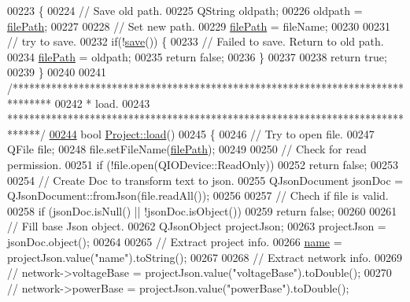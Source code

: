 \begin{DoxyCode}
00223 \{
00224   \textcolor{comment}{// Save old path.}
00225   QString oldpath;
00226   oldpath = \hyperlink{class_project_a79f30adcefd0b72bd4ac7db724bc9531}{filePath};
00227 
00228   \textcolor{comment}{// Set new path.}
00229   \hyperlink{class_project_a79f30adcefd0b72bd4ac7db724bc9531}{filePath} = fileName;
00230 
00231   \textcolor{comment}{// try to save.}
00232   \textcolor{keywordflow}{if}(!\hyperlink{class_project_a596a875bc5be73bc5b1b71b6448c1e07}{save}()) \{
00233     \textcolor{comment}{// Failed to save. Return to old path.}
00234     \hyperlink{class_project_a79f30adcefd0b72bd4ac7db724bc9531}{filePath} = oldpath;
00235     \textcolor{keywordflow}{return} \textcolor{keyword}{false};
00236   \}
00237 
00238   \textcolor{keywordflow}{return} \textcolor{keyword}{true};
00239 \}
00240 
00241 \textcolor{comment}{/*******************************************************************************}
00242 \textcolor{comment}{ * load.}
00243 \textcolor{comment}{ ******************************************************************************/}
\hypertarget{project_8cpp_source_l00244}{}\hyperlink{class_project_a1e373892a0383371132ce68fa5f8813d}{00244} \textcolor{keywordtype}{bool} \hyperlink{class_project_a1e373892a0383371132ce68fa5f8813d}{Project::load}()
00245 \{
00246   \textcolor{comment}{// Try to open file.}
00247   QFile file;
00248   file.setFileName(\hyperlink{class_project_a79f30adcefd0b72bd4ac7db724bc9531}{filePath});
00249 
00250   \textcolor{comment}{// Check for read permission.}
00251   \textcolor{keywordflow}{if} (!file.open(QIODevice::ReadOnly))
00252     \textcolor{keywordflow}{return} \textcolor{keyword}{false};
00253 
00254   \textcolor{comment}{// Create Doc to transform text to json.}
00255   QJsonDocument jsonDoc = QJsonDocument::fromJson(file.readAll());
00256 
00257   \textcolor{comment}{// Chech if file is valid.}
00258   \textcolor{keywordflow}{if} (jsonDoc.isNull() || !jsonDoc.isObject())
00259     \textcolor{keywordflow}{return} \textcolor{keyword}{false};
00260 
00261   \textcolor{comment}{// Fill base Json object.}
00262   QJsonObject projectJson;
00263   projectJson = jsonDoc.object();
00264 
00265   \textcolor{comment}{// Extract project info.}
00266   \hyperlink{class_project_a82dd2d1bc38f9fd08c9a811fcaa76b38}{name} = projectJson.value(\textcolor{stringliteral}{"name"}).toString();
00267 
00268   \textcolor{comment}{// Extract network info.}
00269 \textcolor{comment}{//  network->voltageBase = projectJson.value("voltageBase").toDouble();}
00270 \textcolor{comment}{//  network->powerBase = projectJson.value("powerBase").toDouble();}

\end{DoxyCode}
